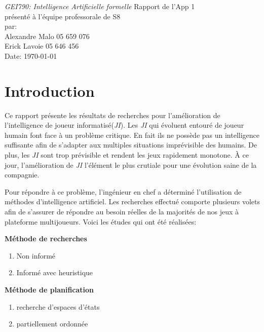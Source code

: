\documentclass[12pt,english,frenchb,letterpaper]{article}
\begin{document}
\thispagestyle{empty}
\begin{center}
{\large\em GEI790:  Intelligence Artificielle formelle}
\vfill
Rapport de l'App 1\\
présenté à l'équipe professorale de S8\\
\vfill
par:\\
Alexandre Malo\hspace{2cm} 05 659 076\\
Erick Lavoie\hspace{2cm} 05 646 456\\
\vfill
Date: \today
\end{center}

\newpage
\onehalfspacing


\tableofcontents

\newpage


\section{Introduction}
Ce rapport présente les résultats de recherches pour l'amélioration de l'intelligence de joueur informatisé(\textit{JI}).
Les \textit{JI} qui évoluent entouré de joueur humain font face à un problème critique. En fait ils ne possède pas un intelligence suffisante afin de s'adapter aux multiples situations imprévisible des humains. De plus, les \textit{JI} sont trop prévisible et rendent les jeux rapidement monotone. À ce jour, l'amélioration de \textit{JI} l'élément le plus crutiale pour une évolution saine de la compagnie.

Pour répondre à ce problème, l'ingénieur en chef a déterminé l'utilisation de méthodes d'intelligence artificiel. Les recherches effectué comporte plusieurs volets afin de s'assurer de répondre au besoin réelles de la majorités de nos jeux à plateforme multijoueurs. Voici les études qui ont été réalisées:

\textbf{Méthode de recherches}
\begin{enumerate}
 \item Non informé
 \item Informé avec heuristique
\end{enumerate}

\textbf{Méthode de planification}
\begin{enumerate}
 \item recherche d'espaces d'états
 \item partiellement ordonnée
\end{enumerate}
\end{document}
